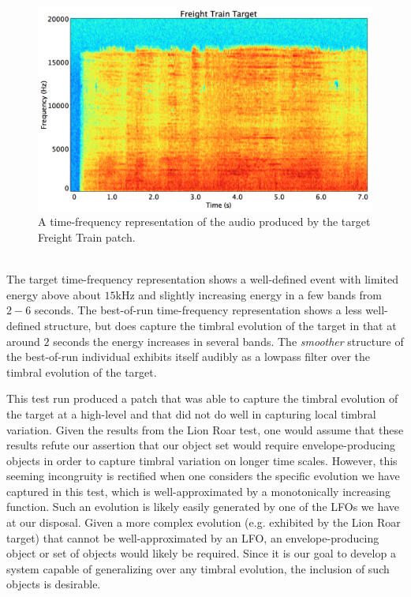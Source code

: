 \documentclass[12pt]{report} 	%
\numberwithin{figure}{chapter}
\numberwithin{table}{chapter}
\numberwithin{equation}{chapter}
\begin{document}
\begin{flushleft}
\begin{figure}[h!]
\begin{center}
\includegraphics[scale=0.35,width=\linewidth]{FreightTrainTargetSTFT}
\caption[Target freight train time-frequency representation]{A time-frequency representation of the audio produced by the target Freight Train patch.}
\end{center}
\end{figure}
\\
The target time-frequency representation shows a well-defined event with limited energy above about $15$kHz and slightly increasing energy in a few bands from $2-6$ seconds. The best-of-run time-frequency representation shows a less well-defined structure, but does capture the timbral evolution of the target in that at around $2$ seconds the energy increases in several bands. The \textit{smoother} structure of the best-of-run individual exhibits itself audibly as a lowpass filter over the timbral evolution of the target.

This test run produced a patch that was able to capture the timbral evolution of the target at a high-level and that did not do well in capturing local timbral variation. Given the results from the Lion Roar test, one would assume that these results refute our assertion that our object set would require envelope-producing objects in order to capture timbral variation on longer time scales. However, this seeming incongruity is rectified when one considers the specific evolution we have captured in this test, which is well-approximated by a monotonically increasing function. Such an evolution is likely easily generated by one of the LFOs we have at our disposal. Given a more complex evolution (e.g. exhibited by the Lion Roar target) that cannot be well-approximated by an LFO, an envelope-producing object or set of objects would likely be required. Since it is our goal to develop a system capable of generalizing over any timbral evolution, the inclusion of such objects is desirable.


\end{flushleft}
\end{document}
